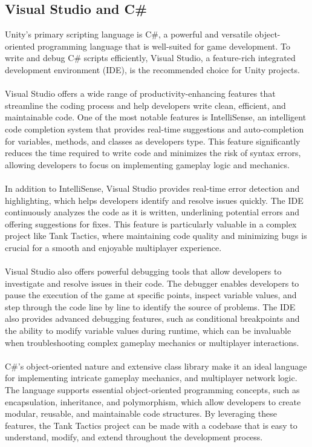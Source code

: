 \subsection{Visual Studio and C\#}

Unity's primary scripting language is C\#, a powerful and versatile object-oriented programming language that is well-suited for game development. To write and debug C\# scripts efficiently, Visual Studio, a feature-rich integrated development environment (IDE), is the recommended choice for Unity projects.
\\
\noindent
\\
Visual Studio offers a wide range of productivity-enhancing features that streamline the coding process and help developers write clean, efficient, and maintainable code. One of the most notable features is IntelliSense, an intelligent code completion system that provides real-time suggestions and auto-completion for variables, methods, and classes as developers type. This feature significantly reduces the time required to write code and minimizes the risk of syntax errors, allowing developers to focus on implementing gameplay logic and mechanics.
\\
\noindent
\\
In addition to IntelliSense, Visual Studio provides real-time error detection and highlighting, which helps developers identify and resolve issues quickly. The IDE continuously analyzes the code as it is written, underlining potential errors and offering suggestions for fixes. This feature is particularly valuable in a complex project like Tank Tactics, where maintaining code quality and minimizing bugs is crucial for a smooth and enjoyable multiplayer experience.
\\
\noindent
\\
Visual Studio also offers powerful debugging tools that allow developers to investigate and resolve issues in their code. The debugger enables developers to pause the execution of the game at specific points, inspect variable values, and step through the code line by line to identify the source of problems. The IDE also provides advanced debugging features, such as conditional breakpoints and the ability to modify variable values during runtime, which can be invaluable when troubleshooting complex gameplay mechanics or multiplayer interactions.
\\
\noindent
\\
C\#'s object-oriented nature and extensive class library make it an ideal language for implementing intricate gameplay mechanics, and multiplayer network logic. The language supports essential object-oriented programming concepts, such as encapsulation, inheritance, and polymorphism, which allow developers to create modular, reusable, and maintainable code structures. By leveraging these features, the Tank Tactics project can be made with a codebase that is easy to understand, modify, and extend throughout the development process.
